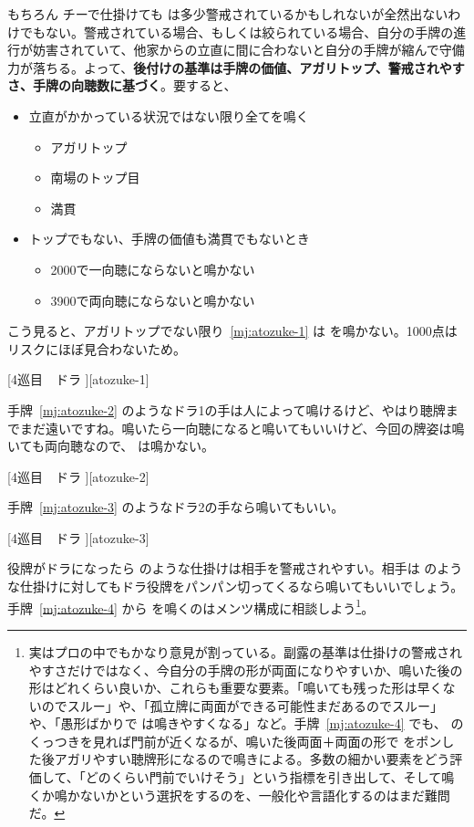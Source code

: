 \documentclass[../nankiru_main.tex]{subfiles}
\begin{document}
もちろん  チーで仕掛けても  は多少警戒されているかもしれないが全然出ないわけでもない。警戒されている場合、もしくは絞られている場合、自分の手牌の進行が妨害されていて、他家からの立直に間に合わないと自分の手牌が縮んで守備力が落ちる。よって、\textbf{後付けの基準は手牌の価値、アガリトップ、警戒されやすさ、手牌の向聴数に基づく}\citep[][pp.~146--151]{tetsusenryaku}。要すると、

\begin{itemize}
  \item 立直がかかっている状況ではない限り全てを鳴く
  \begin{itemize}
    \item アガリトップ
    \item 南場のトップ目
    \item 満貫
  \end{itemize}
  \item トップでもない、手牌の価値も満貫でもないとき
  \begin{itemize}
    \item 2000で一向聴にならないと鳴かない
    \item 3900で両向聴にならないと鳴かない
  \end{itemize}
\end{itemize}

こう見ると、アガリトップでない限り~\ref{mj:atozuke-1} は  を鳴かない。1000点はリスクにほぼ見合わないため。

[4巡目　ドラ ][atozuke-1]

手牌~\ref{mj:atozuke-2} のようなドラ1の手は人によって鳴けるけど、やはり聴牌までまだ遠いですね。鳴いたら一向聴になると鳴いてもいいけど、今回の牌姿は鳴いても両向聴なので、 は鳴かない。

[4巡目　ドラ ][atozuke-2]

手牌~\ref{mj:atozuke-3} のようなドラ2の手なら鳴いてもいい。

[4巡目　ドラ ][atozuke-3]

役牌がドラになったら  のような仕掛けは相手を警戒されやすい。相手は  のような仕掛けに対してもドラ役牌をパンパン切ってくるなら鳴いてもいいでしょう。手牌~\ref{mj:atozuke-4} から  を鳴くのはメンツ構成に相談しよう\citep[][pp.~152--159]{tetsusenryaku}\footnote{実はプロの中でもかなり意見が割っている。副露の基準は仕掛けの警戒されやすさだけではなく、今自分の手牌の形が両面になりやすいか、鳴いた後の形はどれくらい良いか、これらも重要な要素。「鳴いても残った形は早くないのでスルー」や、「孤立牌に両面ができる可能性まだあるのでスルー」や、「愚形ばかりで  は鳴きやすくなる」など。手牌~\ref{mj:atozuke-4} でも、 のくっつきを見れば門前が近くなるが、鳴いた後両面＋両面の形で  をポンした後アガリやすい聴牌形になるので鳴きによる。多数の細かい要素をどう評価して、「どのくらい門前でいけそう」という指標を引き出して、そして鳴くか鳴かないかという選択をするのを、一般化や言語化するのはまだ難問だ。}。
\end{document}
